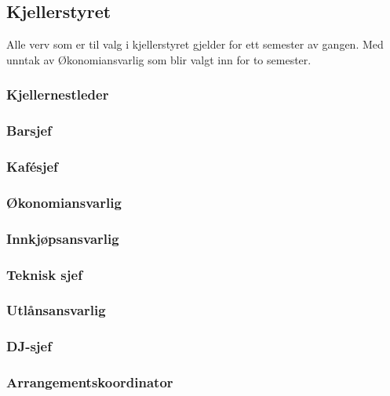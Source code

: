 \documentclass[10pt,norsk,a4paper,usenames,dvipsnames]{article}
\begin{document}
\begin{minipage}[t]{0.5\textwidth}
    \subsection{Kjellerstyret} %
        Alle verv som er til valg i kjellerstyret gjelder for ett semester av gangen. Med unntak av Økonomiansvarlig som blir valgt inn for to semester.
        
        \subsubsection{Kjellernestleder}
        
        
        \subsubsection{Barsjef}
        
        
        \subsubsection{Kafésjef}
        
        
        \subsubsection{Økonomiansvarlig}
        
        
        \subsubsection{Innkjøpsansvarlig}
        
        
        \subsubsection{Teknisk sjef}
        
        
        \subsubsection{Utlånsansvarlig}
        
        
        \subsubsection{DJ-sjef}
        
        
        \subsubsection{Arrangementskoordinator}
\end{minipage}
    
\end{document}

